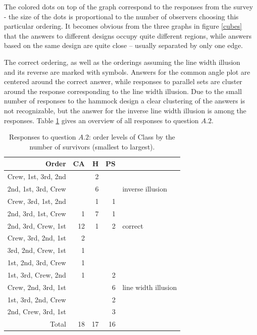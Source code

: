 The colored dots on top of the graph correspond to the responses from the survey - the size of the dots is proportional to the number of observers choosing this particular ordering. It becomes obvious from the three graphs in figure \ref{cubes} that
the answers to different designs occupy quite different regions, while answers based  on the same design are quite close --  usually separated by only one edge. 

The correct ordering, as well as the orderings assuming the line width illusion and its reverse are marked with symbols. Answers for the common angle plot are centered around the correct answer, while responses to parallel sets are cluster around the response corresponding to the line width illusion. Due to the small number of responses to the hammock design a clear clustering of the answers is not recognizable, but the answer for the inverse line width illusion is among the responses. Table \ref{a2} gives an overview of all responses to question $A.2$. 

\begin{table}[ht]
\begin{center}
\begin{tabular}{rrrrl}
Order  & CA & H & PS\\
  \hline
  Crew, 1st, 3rd, 2nd &  &  2 &  \\ 
  2nd, 1st, 3rd, Crew &  &  6 &  & inverse illusion \\ 
   Crew, 3rd, 1st, 2nd &  &  1 &  1 \\ 
  2nd, 3rd, 1st, Crew & 1 & 7 & 1 \\ 
  2nd, 3rd, Crew, 1st & 12 &  1 &  2 & correct\\ 
  Crew, 3rd, 2nd, 1st &  2 &  &  \\ 
  3rd, 2nd, Crew, 1st &  1 &  &  \\ 
  1st, 2nd, 3rd, Crew &  1 &  &   \\ 
  1st, 3rd, Crew, 2nd &  1 &  &  2 \\ 
  Crew, 2nd, 3rd, 1st &  &  & 6 &  line width illusion\\  
  1st, 3rd, 2nd, Crew &  &  &  2 \\ 
  2nd, Crew, 3rd, 1st &  &  &  3 \\ 
   \hline
  Total & 18 & 17 & 16 \\ 
   \hline
\end{tabular}
\end{center}
\caption{\label{a2} Responses to question $A.2$: order levels of Class by the number of survivors (smallest to largest). }
\end{table}

